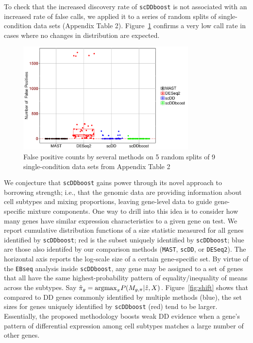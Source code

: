 \documentclass[aoas,preprint]{imsart}
\begin{document}
To check that the increased discovery rate
of   \verb+scDDboost+ is  not associated with an increased rate of false calls, we 
applied it to a series of random splits of single-condition data sets (Appendix Table 2). Figure~\ref{nullperm}
confirms a very low call rate in cases where no changes in distribution are expected.



\begin{figure}[H]
\includegraphics[width = 0.8\textwidth]{Figs/fdrCounts.pdf}
 \caption{False positive counts by several methods on  5 random splits of 9 single-condition
data sets from Appendix Table 2} \label{nullperm}
\end{figure}


We conjecture that \verb+scDDboost+  gains power through its novel approach to  borrowing strength;
i.e., that the genomic data are providing information about cell subtypes and mixing proportions,
leaving gene-level data to guide gene-specific mixture components.   One way to drill into this
idea is to consider how many genes have similar expression characteristics to a given gene on
test. We report cumulative distribution
functions of a size statistic measured for all genes 
 identified by \verb+scDDboost+; red is the subset uniquely identified by \verb+scDDboost+; blue 
are those also identifed by our comparison methods (\verb+MAST+, \verb+scDD+, or \verb+DESeq2+). 
 The horizontal axis reports the log-scale size of a certain gene-specific  set.  
 By virtue of the \verb+EBseq+ analysis inside \verb+scDDboost+, any gene may be assigned to
a set of genes that all have the same highest-probability pattern of equality/inequality of means across
the subtypes. Say $\hat \pi_g = {\rm argmax}_{\pi} P( M_{g,\pi} | \hat z, X)$.  Figure~\ref{fig:shift} shows
that compared to DD genes commonly identified by multiple methods (blue), the set sizes for genes
uniquely identified by \verb+scDDboost+ (red) tend to be larger.  Essentially,  the proposed methodology
 boosts weak DD evidence when a gene's pattern of differential expression among cell subtypes
matches a large number of other genes. 
\end{document}
